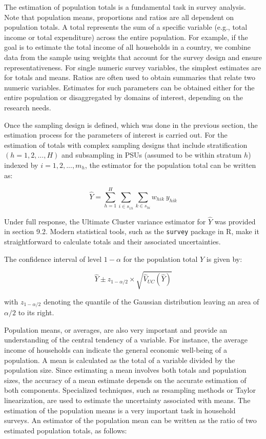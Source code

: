 \documentclass[
  12pt,
]{book}
\begin{document}
The estimation of population totals is a fundamental task in survey analysis. Note that population means, proportions and ratios are all dependent on population totals. A total represents the sum of a specific variable (e.g., total income or total expenditure) across the entire population. For example, if the goal is to estimate the total income of all households in a country, we combine data from the sample using weights that account for the survey design and ensure representativeness. For single numeric survey variables, the simplest estimates are for totals and means. Ratios are often used to obtain summaries that relate two numeric variables. Estimates for such parameters can be obtained either for the entire population or disaggregated by domains of interest, depending on the research needs.

Once the sampling design is defined, which was done in the previous section, the estimation process for the parameters of interest is carried out. For the estimation of totals with complex sampling designs that include stratification \(\left(h=1,2,...,H\right)\) and subsampling in PSUs (assumed to be within stratum \(h\)) indexed by \(i=1,2,...,m_h\), the estimator for the population total can be written as:

\[
\widehat{Y} = \sum_{h=1}^{H}\sum_{i \in s_{1h}} \sum_{ k \in s_{hi}} w_{hik} \ y_{hik}
\]

Under full response, the Ultimate Cluster variance estimator for \(\widehat{Y}\) was provided in section 9.2. Modern statistical tools, such as the \texttt{survey} package in R, make it straightforward to calculate totals and their associated uncertainties.

The confidence interval of level \(1 - \alpha\) for the population total \(Y\) is given by:

\[
\widehat{Y} \pm z_{1 - \alpha/2} \times \sqrt{\widehat{V}_{UC} \left( \widehat{Y}\right)}
\]

with \(z_{1 - \alpha/2}\) denoting the quantile of the Gaussian distribution leaving an area of \({\alpha/2}\) to its right.

Population means, or averages, are also very important and provide an understanding of the central tendency of a variable. For instance, the average income of households can indicate the general economic well-being of a population. A mean is calculated as the total of a variable divided by the population size. Since estimating a mean involves both totals and population sizes, the accuracy of a mean estimate depends on the accurate estimation of both components. Specialized techniques, such as resampling methods or Taylor linearization, are used to estimate the uncertainty associated with means. The estimation of the population means is a very important task in household surveys. An estimator of the population mean can be written as the ratio of two estimated population totals, as follows:
\end{document}

